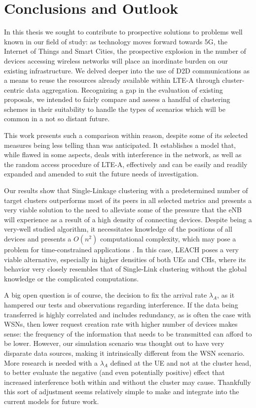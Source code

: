 \chapter{Conclusions and Outlook}

In this thesis we sought to contribute to prospective solutions to problems well known in our field of study: as technology moves forward towards 5G, the Internet of Things and Smart Cities, the prospective explosion in the number of devices accessing wireless networks will place an inordinate burden on our existing infrastructure. We delved deeper into the use of D2D communications as a means to reuse the resources already available within LTE-A through cluster-centric data aggregation. Recognizing a gap in the evaluation of existing proposals, we intended to fairly compare and assess a handful of clustering schemes in their suitability to handle the types of scenarios which will be common in a not so distant future.

This work presents such a comparison within reason, despite some of its selected measures being less telling than was anticipated. It establishes a model that, while flawed in some aspects, deals with interference in the network, as well as the random access procedure of LTE-A, effectively and can be easily and readily expanded and amended to suit the future needs of investigation.

Our results show that Single-Linkage clustering with a predetermined number of target clusters outperforms most of its peers in all selected metrics and presents a very viable solution to the need to alleviate some of the pressure that the eNB will experience as a result of a high density of connecting devices. Despite being a very-well studied algorithm, it necessitates knowledge of the positions of all devices and presents a $O(n^2)$ computational complexity, which may pose a problem for time-constrained applications \cite{Everitt2011}. In this case, LEACH poses a very viable alternative, especially in higher densities of both UEs and CHs, where its behavior very closely resembles that of Single-Link clustering without the global knowledge or the complicated computations.

A big open question is of course, the decision to fix the arrival rate $\lambda_A$, as it hampered our tests and observations regarding interference. If the data being transferred is highly correlated and includes redundancy, as is often the case with WSNs, then lower request creation rate with higher number of devices makes sense: the frequency of the information that needs to be transmitted can afford to be lower. However, our simulation scenario was thought out to have very disparate data sources, making it intrinsically different from the WSN scenario. More research is needed with a $\lambda_A$ defined at the UE and not at the cluster head, to better evaluate the negative (and even potentially positive) effect that increased interference both within and without the cluster may cause. Thankfully this sort of adjustment seems relatively simple to make and integrate into the current models for future work. 


